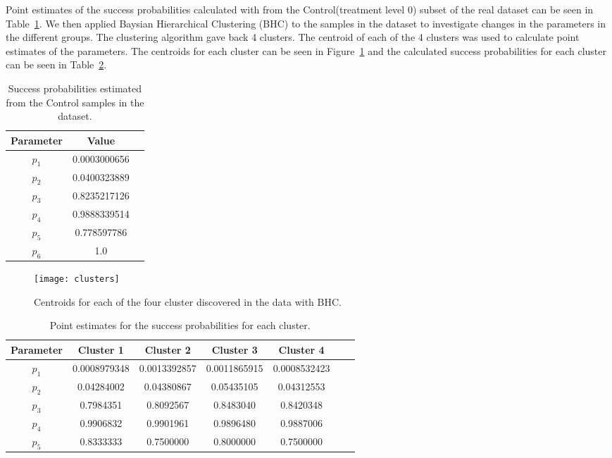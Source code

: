 Point estimates of the  success probabilities calculated with from the
Control(treatment level 0)
subset of the real dataset can be seen in
Table~\ref{tab:param_estimates}. We then applied Baysian Hierarchical
Clustering (BHC) to the samples in the dataset to investigate changes
in the parameters in the different groups. The clustering algorithm
gave back 4 clusters. The centroid of each of the 4 clusters was used
to calculate point estimates of the parameters. The centroids for each
cluster can be seen in Figure~\ref{fig:clusters} and the calculated
success probabilities for each cluster can be seen in
Table~\ref{tab:param_estimates_clusters}.

\begin{table}
\centering
    \begin{tabular}{ccc}
    Parameter & Value \\ \hline
    $p_1$ &  0.0003000656 \\
    $p_2$ & 0.0400323889\\
    $p_3$ &  0.8235217126\\
    $p_4$ &  0.9888339514\\
    $p_5$ &  0.778597786 \\
    $p_6$ &  1.0
    \end{tabular}
\caption{Success probabilities estimated from the Control samples in
  the dataset.}
\label{tab:param_estimates}
\end{table}

\begin{figure}[htbp!]
\centering
\texttt{[image: clusters]}
\caption[ML inverse problem formulation]{Centroids for each of the
  four cluster discovered in the data with BHC.}
\label{fig:clusters}
\end{figure}

\begin{table}
\centering
    \begin{tabular}{ccccccc}
Parameter&  Cluster 1& Cluster 2& Cluster 3& Cluster 4 \\ \hline
$p_1$ & 0.0008979348 & 0.0013392857 & 0.0011865915& 0.0008532423 \\
$p_2$ & 0.04284002 & 0.04380867 & 0.05435105 & 0.04312553 \\
$p_3$ & 0.7984351 & 0.8092567 & 0.8483040 & 0.8420348 \\
$p_4$ &  0.9906832 & 0.9901961 & 0.9896480 & 0.9887006 \\
$p_5$ & 0.8333333 & 0.7500000 & 0.8000000 & 0.7500000 \\
\end{tabular}
\caption{Point estimates for the success probabilities for each cluster.}
\label{tab:param_estimates_clusters}
\end{table}




